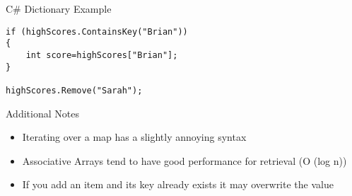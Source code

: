 \begin{frame}[fragile]{C\# Dictionary
	Example}
\begin{lstlisting}
if (highScores.ContainsKey("Brian"))
{
	int score=highScores["Brian"];
}

highScores.Remove("Sarah");
\end{lstlisting}
\end{frame}

\begin{frame}{Additional Notes}
\begin{itemize}
	\pause \item Iterating over a map has a slightly annoying syntax
	\pause \item Associative Arrays tend to have good performance for retrieval (O (log n))
	\pause \item If you add an item and its key already exists it may overwrite the value
\end{itemize}
\end{frame}